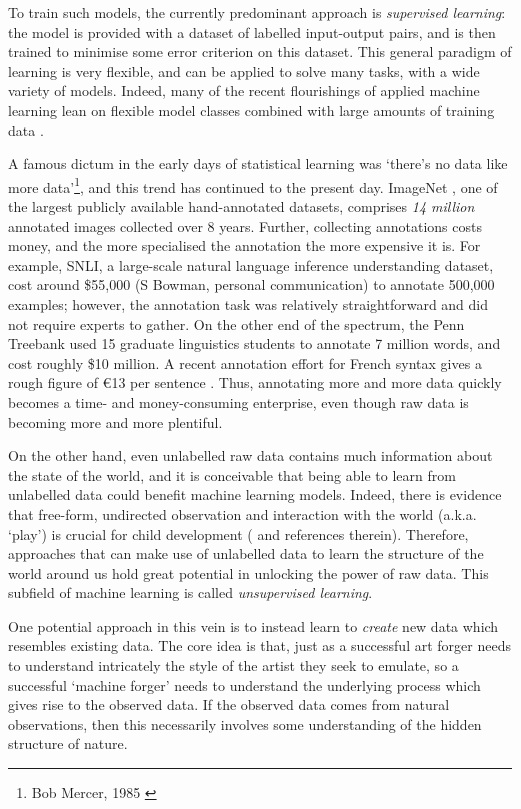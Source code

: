 To train such models, the currently predominant approach is \textit{supervised learning}: the model is provided with a dataset of labelled input-output pairs, and is then trained to minimise some error criterion on this dataset. This general paradigm of learning is very flexible, and can be applied to solve many tasks, with a wide variety of models. Indeed, many of the recent flourishings of applied machine learning lean on flexible model classes combined with large amounts of training data \citep{Krizhevsky:12,Wu:16}.

A famous dictum in the early days of statistical learning was `there's no data like more data'\footnote{Bob Mercer, 1985 \citep{Jelinek:05}}, and this trend has continued to the present day. ImageNet \citep{Deng:09}, one of the largest publicly available hand-annotated datasets, comprises \textit{14 million} annotated images collected over 8 years. Further, collecting annotations costs money, and the more specialised the annotation the more expensive it is. For example, SNLI, a large-scale natural language inference understanding dataset, cost around \$55,000 (S Bowman, personal communication) to annotate 500,000 examples; however, the annotation task was relatively straightforward and did not require experts to gather. On the other end of the spectrum, the Penn Treebank \citep{Marcus:93} used 15 graduate linguistics students to annotate 7 million words, and cost roughly \$10 million. A recent annotation effort for French syntax gives a rough figure of \euro{13} per sentence \citep{Martinez-Alonso:16}. Thus, annotating more and more data quickly becomes a time- and money-consuming enterprise, even though raw data is becoming more and more plentiful.

On the other hand, even unlabelled raw data contains much information about the state of the world, and it is conceivable that being able to learn from unlabelled data could benefit machine learning models. Indeed, there is evidence that free-form, undirected observation and interaction with the world (a.k.a. `play') is crucial for child development (\citet{Frost:98} and references therein). Therefore, approaches that can make use of unlabelled data to learn the structure of the world around us hold great potential in unlocking the power of raw data. This subfield of machine learning is called \textit{unsupervised learning}.

One potential approach in this vein is to instead learn to \textit{create} new data which resembles existing data. The core idea is that, just as a successful art forger needs to understand intricately the style of the artist they seek to emulate, so a successful `machine forger' needs to understand the underlying process which gives rise to the observed data. If the observed data comes from natural observations, then this necessarily involves some understanding of the hidden structure of nature.

